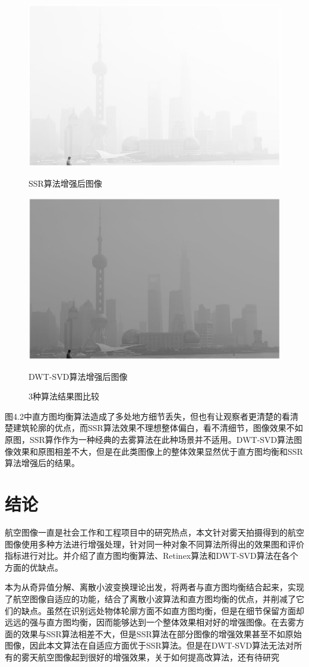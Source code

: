 \documentclass[12pt]{book}
\begin{document}
\begin{figure}[!ht]
					\begin{minipage}{0.48\linewidth}
						\centerline{\includegraphics[width=1\textwidth]{./figures/ssr16.eps}}
						\centerline{SSR算法增强后图像}
					\end{minipage}
					\qquad
					\begin{minipage}{0.48\linewidth}
						\centerline{\includegraphics[width=1\textwidth]{./figures/DWTSVD16.eps}}
						\centerline{DWT-SVD算法增强后图像}
					\end{minipage}
					\caption{3种算法结果图比较\label{ }}
				\end{figure}

图4.2中直方图均衡算法造成了多处地方细节丢失，但也有让观察者更清楚的看清楚建筑轮廓的优点，而SSR算法效果不理想整体偏白，看不清细节，图像效果不如原图，SSR算作作为一种经典的去雾算法在此种场景并不适用。DWT-SVD算法图像效果和原图相差不大，但是在此类图像上的整体效果显然优于直方图均衡和SSR算法增强后的结果。
	\chapter{结论}\label{chap:zongJie}航空图像一直是社会工作和工程项目中的研究热点，本文针对雾天拍摄得到的航空图像使用多种方法进行增强处理，针对同一种对象不同算法所得出的效果图和评价指标进行对比。并介绍了直方图均衡算法、Retinex算法和DWT-SVD算法在各个方面的优缺点。

本为从奇异值分解、离散小波变换理论出发，将两者与直方图均衡结合起来，实现了航空图像自适应的功能，结合了离散小波算法和直方图均衡的优点，并削减了它们的缺点。虽然在识别远处物体轮廓方面不如直方图均衡，但是在细节保留方面却远远的强与直方图均衡，因而能够达到一个整体效果相对好的增强图像。在去雾方面的效果与SSR算法相差不大，但是SSR算法在部分图像的增强效果甚至不如原始图像，因此本文算法在自适应方面优于SSR算法。但是在DWT-SVD算法无法对所有的雾天航空图像起到很好的增强效果，关于如何提高改算法，还有待研究
\end{document}
